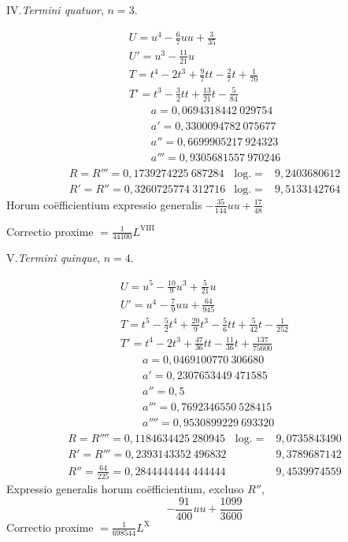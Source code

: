 \par{}\begin{center}IV.\quad\textit{Termini quatuor}, \(n=3\).\end{center}
\[
\begin{array}{l}
U=u^4-\frac{6}{7}uu+\frac{3}{35}\\
U'=u^3-\frac{11}{21}u\\
T=t^4-2t^3+\frac{9}{7}tt-\frac{2}{7}t+\frac{1}{70}\\
T'=t^3-\frac{3}{2}tt+\frac{13}{21}t-\frac{5}{84}\\
\qquad a=0{,}0694318442\ 029754\\
\qquad a'=0{,}3300094782\ 075677\\
\qquad a''=0{,}6699905217\ 924323\\
\qquad a'''=0{,}9305681557\ 970246
\end{array}
\]
\[
\begin{array}{lll}
R=R'''=0{,}1739274225\ 687284&\mathrm{log.}=&9{,}2403680612\\
R'=R''=0{,}3260725774\ 312716&\mathrm{log.}=&9{,}5133142764
\end{array}
\]
\noindent Horum co\"efficientium expressio generalis \(-\frac{35}{144}uu+\frac{17}{48}\)

\noindent Correctio proxime \(=\frac{1}{44100}L^{\mathrm{VIII}}\)
\endgroup
{}
\begingroup\renewcommand{\arraystretch}{1.6}
\par{}\begin{center}V.\quad\textit{Termini quinque}, \(n=4\).\end{center}
\[
\begin{array}{l}
U=u^5-\frac{10}{9}u^3+\frac{5}{21}u\\
U'=u^4-\frac{7}{9}uu+\frac{64}{945}\\
T=t^5-\frac{5}{2}t^4+\frac{20}{9}t^3-\frac{5}{6}tt+\frac{5}{42}t-\frac{1}{252}\\
T'=t^4-2t^3+\frac{47}{36}tt-\frac{11}{36}t+\frac{137}{75600}\\
\qquad a=0{,}0469100770\ 306680\\
\qquad a'=0{,}2307653449\ 471585\\
\qquad a''=0{,}5\\
\qquad a'''=0{,}7692346550\ 528415\\
\qquad a''''=0{,}9530899229\ 693320
\end{array}
\]
\[
\begin{array}{lll}
R=R''''=0{,}1184634425\ 280945&\mathrm{log.}=&9{,}0735843490\\
R'=R'''=0{,}2393143352\ 496832&&9{,}3789687142\\
R''=\frac{64}{225}=0{,}2844444444\ 444444&&9{,}4539974559
\end{array}
\]
\noindent Expressio generalis horum co\"efficientium, excluso \(R''\),
\[
-\frac{91}{400}uu+\frac{1099}{3600}
\]
\noindent Correctio proxime \(=\frac{1}{698544}L^{\mathrm{X}}\)

